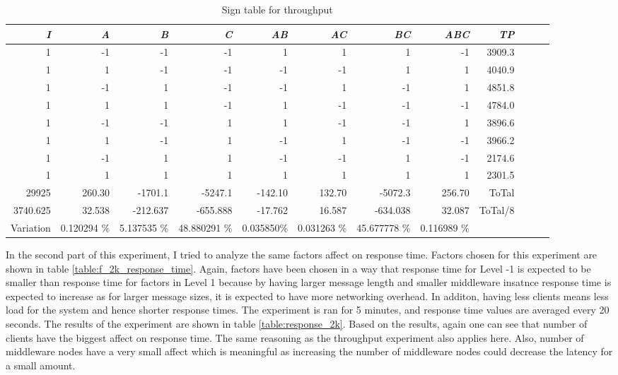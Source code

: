 \documentclass[11pt]{article}
\begin{document}
\begin{table}[!ht]
\begin{adjustbox}{width=1\textwidth}
\begin{tabular}{*{12}r}  \toprule
\emph{I}  &  \emph{A} & \emph{B}  & \emph{C} & \emph{AB} & \emph{AC} & \emph{BC} & \emph{ABC} & \emph{TP}  \\\midrule
1  & -1 & -1 & -1 &  1  &  1  &  1  & -1  &  3909.3 \\
1  &  1 & -1 & -1 & -1  & -1  &  1  &  1  &  4040.9 \\
1  & -1 &  1 & -1 & -1  &  1  & -1  &  1  &  4851.8 \\
1  &  1 &  1 & -1 &  1  & -1  & -1  & -1  &  4784.0 \\ 
1  & -1 & -1 &  1 &  1  & -1  & -1  &  1  &  3896.6 \\
1  &  1 & -1 &  1 & -1  &  1  & -1  & -1  &  3966.2 \\
1  & -1 &  1 &  1 & -1  & -1  &  1  & -1  &  2174.6 \\
1  &  1 &  1 &  1 &  1  &  1  &  1  &  1  &  2301.5 \\\hline
 29925 &  260.30 & -1701.1 & -5247.1 & -142.10 &  132.70 &-5072.3 &  256.70 & ToTal\\
 3740.625 &32.538 &  -212.637 &  -655.888 &   -17.762  &   16.587 &  -634.038& 32.087 & ToTal/8 \\
 Variation & 0.120294 \% &   5.137535 \% &  48.880291 \% &    0.035850\% &   0.031263 \% &   45.677778 \% & 0.116989 \%  \\
 \hline
\end{tabular}
\end{adjustbox}
 \caption{Sign table for throughput}
 \label{table:2k_throughput}
\centering
\end{table}

In the second part of this experiment, I tried to analyze the same factors affect
on response time. Factors chosen for this experiment are shown in table
\ref{table:f_2k_response_time}. Again, factors have been chosen in a way that 
response time for Level -1 is expected to be smaller than response time for 
factors in Level 1 because by having larger message length and smaller middleware insatnce 
response time is expected to increase as for larger message sizes, it is expected to 
have more networking overhead. In additon, having less clients means less load 
for the system and hence shorter response times. The experiment is ran for 
5 minutes, and response time values are averaged every 20 seconds.
The results of the experiment are shown in table \ref{table:response_2k}.
Based on the results, again one can see that number of clients have the 
biggest affect on response time. The same reasoning as the throughput experiment
also applies here. Also, number of middleware nodes have a very small affect 
which is meaningful as increasing the number of middleware nodes could 
decrease the latency for a small amount. 
\end{document}
